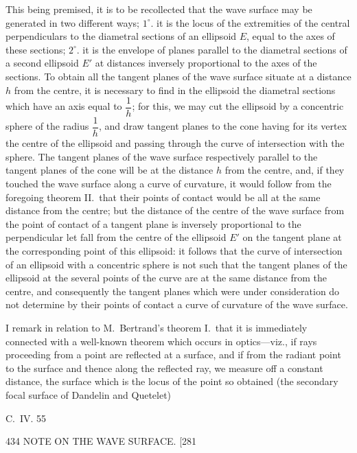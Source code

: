 \documentclass[11pt]{article}
\begin{document}
This being premised, it is to be recollected that the wave surface may be generated
in two different ways; $1^{\circ}$. it is the locus of the extremities of the central
perpendiculars to the diametral sections of an ellipsoid $E$, equal to the axes of
these sections; $2^{\circ}$. it is the envelope of planes parallel to the diametral
sections of a second ellipsoid $E'$ at distances inversely proportional to the axes
of the sections. To obtain all the tangent planes of the wave surface situate at a
distance $h$ from the centre, it is necessary to find in the ellipsoid the diametral
sections which have an axis equal to $\dfrac{1}{h}$; for this, we may cut the ellipsoid
by a concentric sphere of the radius $\dfrac{1}{h}$, and draw tangent planes to the
cone having for its vertex the centre of the ellipsoid and passing through the curve
of intersection with the sphere. The tangent planes of the wave surface respectively
parallel to the tangent planes of the cone will be at the distance $h$ from the
centre, and, if they touched the wave surface along a curve of curvature, it would
follow from the foregoing theorem II.\ that their points of contact would be all at
the same distance from the centre; but the distance of the centre of the wave surface
from the point of contact of a tangent plane is inversely proportional to the
perpendicular let fall from the centre of the ellipsoid $E'$ on the tangent plane at
the corresponding point of this ellipsoid: it follows that the curve of intersection
of an ellipsoid with a concentric sphere is not such that the tangent planes of the
ellipsoid at the several points of the curve are at the same distance from the centre,
and consequently the tangent planes which were under consideration do not determine
by their points of contact a curve of curvature of the wave surface.

I remark in relation to M.\ Bertrand's theorem I.\ that it is immediately connected
with a well-known theorem which occurs in optics---viz., if rays proceeding from a
point are reflected at a surface, and if from the radiant point to the surface and
thence along the reflected ray, we measure off a constant distance, the surface which
is the locus of the point so obtained (the secondary focal surface of Dandelin and
Quetelet)

\begin{center}
C.\ IV. \hfill 55
\end{center}

\begin{center}
434 \hfill NOTE ON THE WAVE SURFACE. \hfill \textsc{[281}
\end{center}
\end{document}
